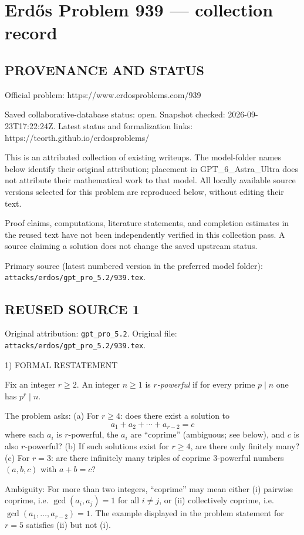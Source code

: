 \section*{Erd\H{o}s Problem 939 --- collection record}

\subsection*{PROVENANCE AND STATUS}
Official problem: https://www.erdosproblems.com/939

Saved collaborative-database status: open.
Snapshot checked: 2026-09-23T17:22:24Z.
Latest status and formalization links: https://teorth.github.io/erdosproblems/

This is an attributed collection of existing writeups. The model-folder names below identify their original attribution; placement in GPT\_6\_Astra\_Ultra does not attribute their mathematical work to that model. All locally available source versions selected for this problem are reproduced below, without editing their text.

Proof claims, computations, literature statements, and completion estimates in the reused text have not been independently verified in this collection pass. A source claiming a solution does not change the saved upstream status.

Primary source (latest numbered version in the preferred model folder): \texttt{attacks/erdos/gpt\_pro\_5.2/939.tex}.

\subsection*{REUSED SOURCE 1}
Original attribution: \texttt{gpt\_pro\_5.2}.
Original file: \texttt{attacks/erdos/gpt\_pro\_5.2/939.tex}.


1) FORMAL RESTATEMENT

Fix an integer \(r\ge 2\). An integer \(n\ge 1\) is \emph{\(r\)-powerful} if for every prime \(p\mid n\) one has \(p^r\mid n\).

The problem asks:
(a) For \(r\ge 4\): does there exist a solution to
\[a_1+a_2+\cdots + a_{r-2}=c\]
where each \(a_i\) is \(r\)-powerful, the \(a_i\) are ``coprime'' (ambiguous; see below), and \(c\) is also \(r\)-powerful?
(b) If such solutions exist for \(r\ge 4\), are there only finitely many?
(c) For \(r=3\): are there infinitely many triples of coprime \(3\)-powerful numbers \((a,b,c)\) with \(a+b=c\)?

Ambiguity: For more than two integers, ``coprime'' may mean either (i) pairwise coprime, i.e. \(\gcd(a_i,a_j)=1\) for all \(i\ne j\), or (ii) collectively coprime, i.e. \(\gcd(a_1,\dots,a_{r-2})=1\). The example displayed in the problem statement for \(r=5\) satisfies (ii) but not (i).

